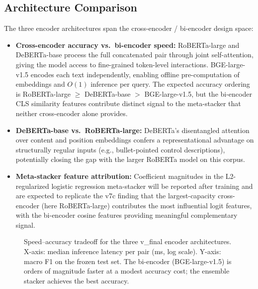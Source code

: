 \subsection{Architecture Comparison}

The three encoder architectures span the cross-encoder / bi-encoder
design space:

\begin{itemize}
    \item \textbf{Cross-encoder accuracy vs.\ bi-encoder speed:}
          RoBERTa-large and DeBERTa-base process the full concatenated
          pair through joint self-attention, giving the model access to
          fine-grained token-level interactions. BGE-large-v1.5 encodes
          each text independently, enabling offline pre-computation of
          embeddings and $O(1)$ inference per query. The expected
          accuracy ordering is RoBERTa-large $\geq$ DeBERTa-base
          $>$ BGE-large-v1.5, but the bi-encoder CLS similarity features
          contribute distinct signal to the meta-stacker that neither
          cross-encoder alone provides.

    \item \textbf{DeBERTa-base vs.\ RoBERTa-large:} DeBERTa's
          disentangled attention over content and position embeddings
          confers a representational advantage on structurally regular
          inputs (e.g., bullet-pointed control descriptions), potentially
          closing the gap with the larger RoBERTa model on this corpus.

    \item \textbf{Meta-stacker feature attribution:} Coefficient
          magnitudes in the L2-regularized logistic regression
          meta-stacker will be reported after training and are expected
          to replicate the v7c finding that the largest-capacity
          cross-encoder (here RoBERTa-large) contributes the most
          influential logit features, with the bi-encoder cosine features
          providing meaningful complementary signal.
\end{itemize}

\begin{figure}[t]
\centering
\caption{Speed--accuracy tradeoff for the three v\_final encoder
architectures. X-axis: median inference latency per pair (ms, log
scale). Y-axis: macro F1 on the frozen test set. The bi-encoder
(BGE-large-v1.5) is orders of magnitude faster at a modest accuracy
cost; the ensemble stacker achieves the best accuracy.}
\label{fig:arch_comparison}
\end{figure}

